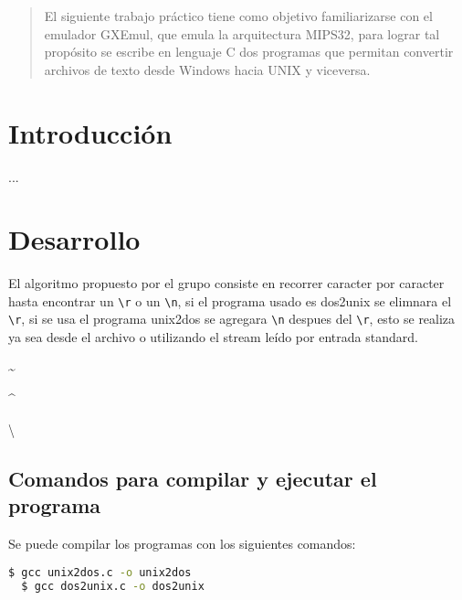 \documentclass[a4paper]{article}
\begin{document}

\fecha{\today}



\maketitle

\renewcommand{\abstractname}{Resumen} 
\begin{abstract}
El siguiente trabajo práctico tiene como objetivo familiarizarse con el emulador GXEmul, que emula la arquitectura MIPS32, para lograr tal propósito se escribe en lenguaje C dos programas que permitan convertir archivos de texto desde Windows hacia UNIX y viceversa.
\end{abstract}


\section{Introducción}
...


\section{Desarrollo}

El algoritmo propuesto por el grupo consiste en recorrer caracter por caracter hasta encontrar un \verb|\r| o un \verb|\n|, si el programa usado es dos2unix se elimnara el \verb|\r|, si se usa el programa unix2dos se agregara \verb|\n| despues del \verb|\r|, esto se realiza ya sea desde el archivo o utilizando el stream leído por entrada standard.

\textasciitilde

\textasciicircum

\textbackslash

\subsection{Comandos para compilar y ejecutar el programa}

Se puede compilar los programas con los siguientes comandos:

\begin{lstlisting}[language=bash]
  $ gcc unix2dos.c -o unix2dos
  $ gcc dos2unix.c -o dos2unix
\end{lstlisting}
\end{document}
